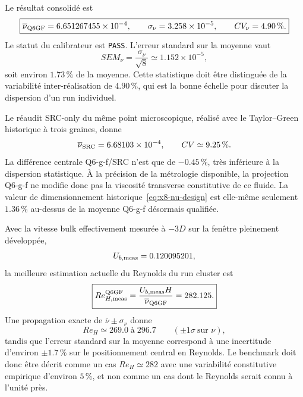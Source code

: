 \documentclass[11pt,a4paper]{article}
\begin{document}
Le résultat consolidé est
\begin{equation}
  \boxed{
  \overline\nu_{\rm Q6GF}
  =6.651267455\times10^{-4},
  \qquad
  \sigma_\nu=3.258\times10^{-5},
  \qquad
  CV_\nu=4.90\,\%.
  }
  \label{eq:x8-nu-q6gf-qualified}
\end{equation}
Le statut du calibrateur est \texttt{PASS}. L'erreur standard sur la moyenne vaut
\begin{equation}
  SEM_\nu=\frac{\sigma_\nu}{\sqrt 8}
  \simeq1.152\times10^{-5},
\end{equation}
soit environ $1.73\,\%$ de la moyenne. Cette statistique doit être distinguée de la variabilité inter-réalisation de $4.90\,\%$, qui est la bonne échelle pour discuter la dispersion d'un run individuel.

Le réaudit SRC-only du même point microscopique, réalisé avec le Taylor--Green historique à trois graines, donne
\begin{equation}
  \overline\nu_{\rm SRC}=6.68103\times10^{-4},
  \qquad CV\simeq9.25\,\%.
\end{equation}
La différence centrale Q6-g-f/SRC n'est que de $-0.45\,\%$, très inférieure à la dispersion statistique. À la précision de la métrologie disponible, la projection Q6-g-f ne modifie donc pas la viscosité transverse constitutive de ce fluide. La valeur de dimensionnement historique~\eqref{eq:x8-nu-design} est elle-même seulement $1.36\,\%$ au-dessus de la moyenne Q6-g-f désormais qualifiée.

Avec la vitesse bulk effectivement mesurée à $-3D$ sur la fenêtre pleinement développée,
\begin{equation}
  U_{b,\rm meas}=0.120095201,
\end{equation}
la meilleure estimation actuelle du Reynolds du run cluster est
\begin{equation}
  \boxed{
  Re_{H,\rm meas}^{\rm Q6GF}
  =\frac{U_{b,\rm meas}H}{\overline\nu_{\rm Q6GF}}
  =282.125.
  }
  \label{eq:x8-Re-qualified}
\end{equation}
Une propagation exacte de $\overline\nu\pm\sigma_\nu$ donne
\begin{equation}
  Re_H\simeq269.0\;\text{à}\;296.7
  \qquad (\pm1\sigma\ \text{sur }\nu),
  \label{eq:x8-Re-one-sigma}
\end{equation}
tandis que l'erreur standard sur la moyenne correspond à une incertitude d'environ $\pm1.7\,\%$ sur le positionnement central en Reynolds. Le benchmark doit donc être décrit comme un cas $Re_H\simeq282$ avec une variabilité constitutive empirique d'environ $5\,\%$, et non comme un cas dont le Reynolds serait connu à l'unité près.
\end{document}
